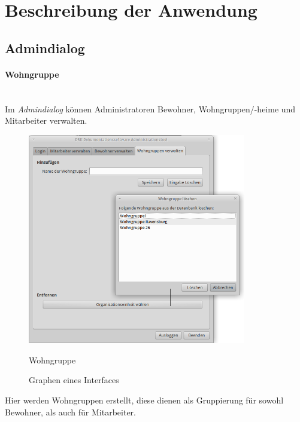\section{Beschreibung der Anwendung}
\label{sec:beschreibung}
\subsection{Admindialog}
\paragraph{Wohngruppe}\mbox{}\\
Im \textit{Admindialog} können Administratoren Bewohner, Wohngruppen/-heime und Mitarbeiter verwalten.
\begin{figure}[h]
	\begin{center}
		\includegraphics[keepaspectratio=true, width=0.85\textwidth]{pics/admin3.png}
		\caption{Wohngruppe}
		\label{Admindialog Wohngruppe}
		\caption{Graphen eines Interfaces}
		\label{Admindialog_Mitarbeiter_erstellen}
	\end{center}
\end{figure}
\FloatBarrier
\noindent
Hier werden Wohngruppen erstellt, diese dienen als Gruppierung für sowohl Bewohner, als auch für Mitarbeiter.
\newpage
\noindent
